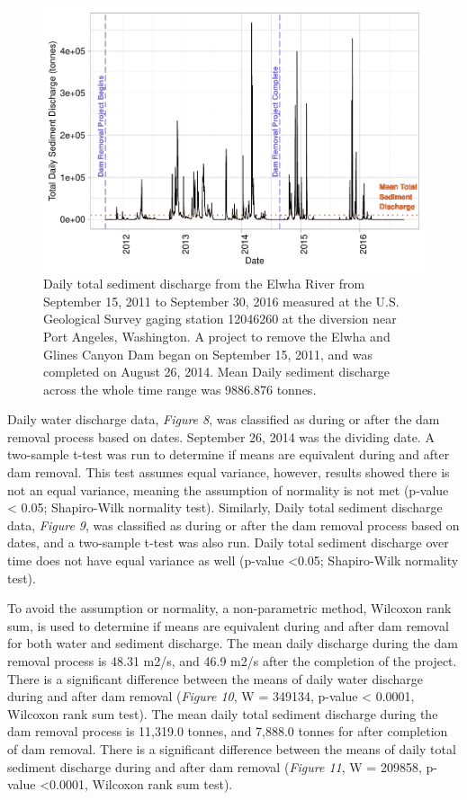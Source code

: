 \documentclass[12pt,]{article}
\begin{document}
\newpage

\begin{figure}
\centering
\includegraphics{Mason_ENV872_ProjectFinal_files/figure-latex/Intro to Question (Figure 9)-1.pdf}
\caption{Daily total sediment discharge from the Elwha River from
September 15, 2011 to September 30, 2016 measured at the U.S. Geological
Survey gaging station 12046260 at the diversion near Port Angeles,
Washington. A project to remove the Elwha and Glines Canyon Dam began on
September 15, 2011, and was completed on August 26, 2014. Mean Daily
sediment discharge across the whole time range was 9886.876 tonnes.}
\end{figure}

\newpage

Daily water discharge data, \emph{Figure 8}, was classified as during or
after the dam removal process based on dates. September 26, 2014 was the
dividing date. A two-sample t-test was run to determine if means are
equivalent during and after dam removal. This test assumes equal
variance, however, results showed there is not an equal variance,
meaning the assumption of normality is not met (p-value \textless{}
0.05; Shapiro-Wilk normality test). Similarly, Daily total sediment
discharge data, \emph{Figure 9}, was classified as during or after the
dam removal process based on dates, and a two-sample t-test was also
run. Daily total sediment discharge over time does not have equal
variance as well (p-value \textless{}0.05; Shapiro-Wilk normality test).

To avoid the assumption or normality, a non-parametric method, Wilcoxon
rank sum, is used to determine if means are equivalent during and after
dam removal for both water and sediment discharge. The mean daily
discharge during the dam removal process is 48.31 m2/s, and 46.9 m2/s
after the completion of the project. There is a significant difference
between the means of daily water discharge during and after dam removal
(\emph{Figure 10}, W = 349134, p-value \textless{} 0.0001, Wilcoxon rank
sum test). The mean daily total sediment discharge during the dam
removal process is 11,319.0 tonnes, and 7,888.0 tonnes for after
completion of dam removal. There is a significant difference between the
means of daily total sediment discharge during and after dam removal
(\emph{Figure 11}, W = 209858, p-value \textless{}0.0001, Wilcoxon rank
sum test).
\end{document}
